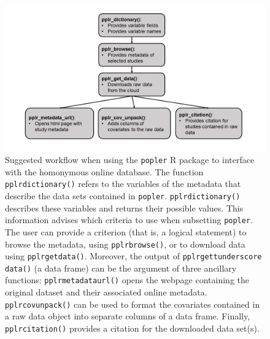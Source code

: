 \documentclass{article}\usepackage[]{graphicx}\usepackage[]{color}
\begin{document}
\newpage
\begin{figure}[h!]
  \begin{center}
    \includegraphics[scale=0.4]{pack_funs}
    \caption{Suggested workflow when using the \texttt{popler} R package to interface with the homonymous online database. The function \texttt{pplr\textunderscore dictionary()} refers to the variables of the metadata that describe the data sets contained in \texttt{popler}. \texttt{pplr\textunderscore dictionary()} describes these variables and returns their possible values. This information advises which criteria to use when subsetting \texttt{popler}. The user can provide a criterion (that is, a logical statement) to browse the metadata, using \texttt{pplr\textunderscore browse()}, or to download data using \texttt{pplr\textunderscore get\textunderscore data()}. Moreover, the output of \texttt{pplr\textunderscore get\tex tunderscore data()} (a data frame) can be the argument of three ancillary functions: \texttt{pplr\textunderscore metadata\textunderscore url()} opens the webpage containing the original dataset and their associated online metadata. \texttt{pplr\textunderscore cov\textunderscore unpack()} can be used to format the covariates contained in a raw data object into separate columns of a data frame. Finally, \texttt{pplr\textunderscore citation()} provides a citation for the downloaded data set(s).}
    \label{Fig:pack_funs}
  \end{center}
\end{figure}

\end{document}

